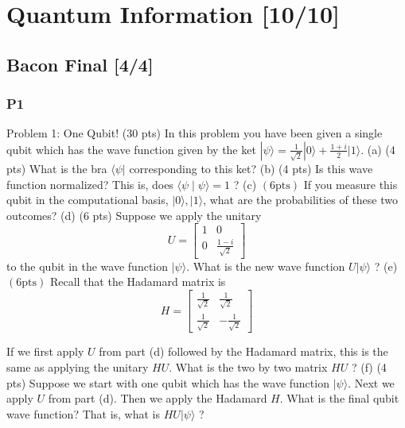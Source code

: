 \documentclass[11pt]{article}
\begin{document}
\section{Quantum Information [10/10]}
\label{sec:org0322927}
\subsection{Bacon Final [4/4]}
\label{sec:org9a8fe5b}
\subsubsection{P1}
\label{sec:orgcaa70ac}
Problem 1: One Qubit! (30 pts)
In this problem you have been given a single qubit which has the wave function given by the ket \(|\psi\rangle=\frac{1}{\sqrt{2}}|0\rangle+\frac{1+i}{2}|1\rangle\).
(a) (4 pts) What is the bra \(\langle\psi|\) corresponding to this ket?
(b) (4 pts) Is this wave function normalized? This is, does \(\langle\psi \mid \psi\rangle=1\) ?
(c) \((6 \mathrm{pts})\) If you measure this qubit in the computational basis, \(|0\rangle,|1\rangle\), what are the probabilities of these two outcomes?
(d) (6 pts) Suppose we apply the unitary
$$
U=\left[\begin{array}{cc}
1 & 0 \\
0 & \frac{1-i}{\sqrt{2}}
\end{array}\right]
$$
to the qubit in the wave function \(|\psi\rangle\). What is the new wave function \(U|\psi\rangle\) ?
(e) \((6 \mathrm{pts})\) Recall that the Hadamard matrix is
$$
H=\left[\begin{array}{cc}
\frac{1}{\sqrt{2}} & \frac{1}{\sqrt{2}} \\
\frac{1}{\sqrt{2}} & -\frac{1}{\sqrt{2}}
\end{array}\right]
$$

If we first apply \(U\) from part (d) followed by the Hadamard matrix, this is the same as applying the unitary \(H U\). What is the two by two matrix \(H U\) ?
(f) (4 pts) Suppose we start with one qubit which has the wave function \(|\psi\rangle\). Next we apply \(U\) from part (d). Then we apply the Hadamard \(H\). What is the final qubit wave function? That is, what is \(H U|\psi\rangle\) ?
\end{document}
